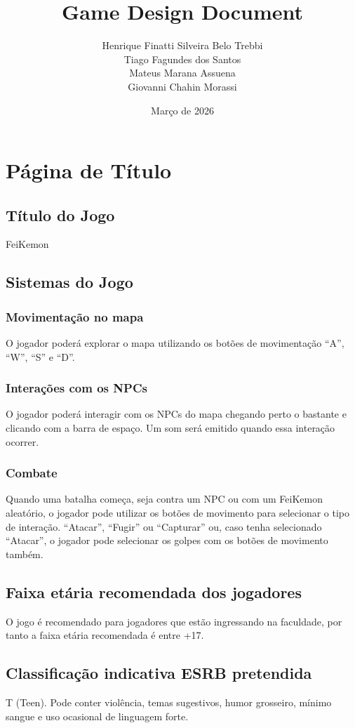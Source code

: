 \documentclass[a4paper,12pt]{article}
\title{Game Design Document}
\author{
    Henrique Finatti Silveira Belo Trebbi \\
    Tiago Fagundes dos Santos \\
    Mateus Marana Assuena \\
    Giovanni Chahin Morassi \\
}
\date{Março de 2026}
\begin{document}
\maketitle
\newpage
\tableofcontents

\newpage
\section{Página de Título}
\subsection{Título do Jogo}
FeiKemon

\subsection{Sistemas do Jogo}
\subsubsection{Movimentação no mapa}
O jogador poderá explorar o mapa utilizando os botões de movimentação “A”, “W”, “S” e “D”.

\subsubsection{Interações com os NPCs}
O jogador poderá interagir com os NPCs do mapa chegando perto o bastante e clicando com a barra de espaço.
Um som será emitido quando essa interação ocorrer.

\subsubsection{Combate}
Quando uma batalha começa, seja contra um NPC ou com um FeiKemon aleatório,
o jogador pode utilizar os botões de movimento para selecionar o tipo de interação.
“Atacar”, “Fugir” ou “Capturar” ou, caso tenha selecionado “Atacar”,
o jogador pode selecionar os golpes com os botões de movimento também.

\subsection{Faixa etária recomendada dos jogadores}
O jogo é recomendado para jogadores que estão ingressando na faculdade,
por tanto a faixa etária recomendada é entre +17.

\subsection{Classificação indicativa ESRB pretendida}
T (Teen). Pode conter violência, temas sugestivos, humor grosseiro, mínimo sangue e uso ocasional de linguagem forte.
\end{document}
